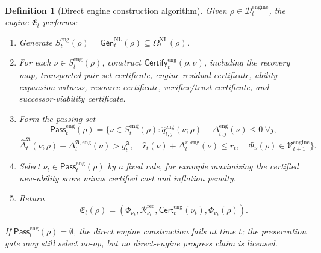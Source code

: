 \documentclass[11pt]{article}
\newtheorem{definition}[theorem]{Definition}
\newcommand{\Rcal}{\mathcal{R}}
\newcommand{\1}{\mathbf{1}}
\providecommand{\Dcal}{\mathcal{D}}
\providecommand{\Vcal}{\mathcal{V}}
\begin{document}
\begin{definition}[Direct engine construction algorithm]
\label{def:direct_engine_construction_algorithm}
Given \(\rho\in\Dcal_t^{\mathrm{engine}}\), the engine \(\mathfrak E_t\) performs:
\begin{enumerate}[label=(\arabic*),leftmargin=1.5em]
    \item Generate \(S_t^{\mathrm{eng}}(\rho)=\mathsf{Gen}_t^{\mathrm{NL}}(\rho)\subseteq\Omega_t^{\mathrm{NL}}(\rho)\).
    \item For each \(\nu\in S_t^{\mathrm{eng}}(\rho)\), construct \(\mathsf{Certify}_t^{\mathrm{eng}}(\rho,\nu)\), including the recovery map, transported pair-set certificate, engine residual certificate, ability-expansion witness, resource certificate, verifier/trust certificate, and successor-viability certificate.
    \item Form the passing set
    \[
    \mathsf{Pass}_t^{\mathrm{eng}}(\rho)
    =
    \{\nu\in S_t^{\mathrm{eng}}(\rho):
    \widehat q_{t,j}^{\mathrm{eng}}(\nu;\rho)+\Delta_{t,j}^{\mathrm{eng}}(\nu)\le0\ \forall j,
    \]
    \[
    \widehat\Delta_t^{\mathfrak A}(\nu;\rho)-\Delta_t^{\mathfrak A,\mathrm{eng}}(\nu)>g_t^{\mathfrak A},
    \quad
    \widehat r_t(\nu)+\Delta_t^{r,\mathrm{eng}}(\nu)\le r_t,
    \quad
    \Phi_\nu(\rho)\in\Vcal_{t+1}^{\mathrm{engine}}\}.
    \]
    \item Select \(\nu_t\in\mathsf{Pass}_t^{\mathrm{eng}}(\rho)\) by a fixed rule, for example maximizing the certified new-ability score minus certified cost and inflation penalty.
    \item Return
    \[
    \mathfrak E_t(\rho)=
    (\Phi_{\nu_t},\Rcal_{\nu_t}^{\mathrm{rec}},\mathsf{Cert}_t^{\mathrm{eng}}(\nu_t),\Phi_{\nu_t}(\rho)).
    \]
\end{enumerate}
If \(\mathsf{Pass}_t^{\mathrm{eng}}(\rho)=\emptyset\), the direct engine construction fails at time \(t\); the preservation gate may still select no-op, but no direct-engine progress claim is licensed.
\end{definition}
\end{document}
